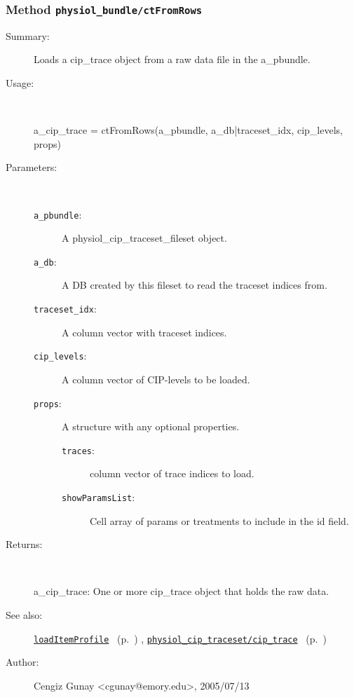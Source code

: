 \subsubsection[Method \texttt{ctFromRows}]{Method \texttt{physiol\_bundle/ctFromRows}}%
%
\label{ref_physiol_bundle__ctFromRows}%
\hypertarget{ref_physiol_bundle__ctFromRows}{}%
\begin{description}
\item[Summary:]Loads a cip\_trace object from a raw data file in the a\_pbundle.
%
\item[Usage:]~%
\begin{lyxcode}%
a\_cip\_trace = ctFromRows(a\_pbundle, a\_db|traceset\_idx, cip\_levels, props)
%
\end{lyxcode}%
%
%
\item[Parameters:]~
\begin{description}%
\item[\texttt{a\_pbundle}:]
 A physiol\_cip\_traceset\_fileset object.
\item[\texttt{a\_db}:]
 A DB created by this fileset to read the traceset indices from.
\item[\texttt{traceset\_idx}:]
 A column vector with traceset indices.
\item[\texttt{cip\_levels}:]
 A column vector of CIP-levels to be loaded.
\item[\texttt{props}:]
 A structure with any optional properties.
\begin{description}%
\item[\texttt{traces}:]
 column vector of trace indices to load.
\item[\texttt{showParamsList}:]
 Cell array of params or treatments to include in the id field.
\end{description}%
\end{description}%
%
\item[Returns:]~

	a\_cip\_trace: One or more cip\_trace object that holds the raw data.
%
%
\item[See also:]%
\hyperlink{ref_loadItemProfile}{\texttt{loadItemProfile}}%
\ (p.~\pageref{ref_loadItemProfile})%
%
, \hyperlink{ref_physiol_cip_traceset__cip_trace}{\texttt{physiol\_cip\_traceset/cip\_trace}}%
\ (p.~\pageref{ref_physiol_cip_traceset__cip_trace})%
%
%
\item[Author:]%
Cengiz Gunay <cgunay@emory.edu>, 2005/07/13%
\end{description}
\methodline%
